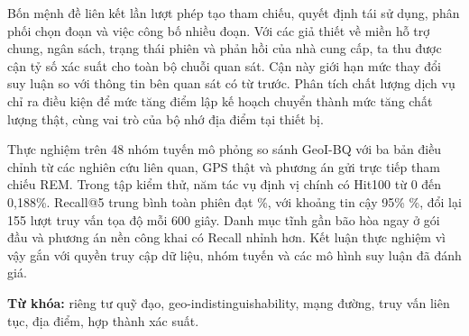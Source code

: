 Bốn mệnh đề liên kết lần lượt phép tạo tham chiếu, quyết định tái sử dụng, phân phối chọn
đoạn và việc công bố nhiều đoạn. Với các giả thiết về miền hỗ trợ chung, ngân sách, trạng
thái phiên và phản hồi của nhà cung cấp, ta thu được cận tỷ số xác suất cho toàn bộ chuỗi
quan sát. Cận này giới hạn mức thay đổi suy luận so với thông tin bên quan sát có từ trước.
Phân tích chất lượng dịch vụ chỉ ra điều kiện để mức tăng điểm lập kế hoạch chuyển thành
mức tăng chất lượng thật, cùng vai trò của bộ nhớ địa điểm tại thiết bị.

Thực nghiệm trên 48 nhóm tuyến mô phỏng so sánh GeoI-BQ với ba bản điều chỉnh từ các
nghiên cứu liên quan, GPS thật và phương án gửi trực tiếp tham chiếu REM. Trong tập kiểm
thử, năm tác vụ định vị chính có Hit100 từ 0 đến 0,188\%. Recall@5 trung bình toàn phiên
đạt \PrimaryRecall\%, với khoảng tin cậy 95\% \PrimaryCI\%, đổi lại 155 lượt truy vấn tọa
độ mỗi 600 giây. Danh mục tĩnh gần bão hòa ngay ở gói đầu và phương án nền công khai có
Recall nhỉnh hơn. Kết luận thực nghiệm vì vậy gắn với quyền truy cập dữ liệu, nhóm tuyến
và các mô hình suy luận đã đánh giá.

\noindent\textbf{Từ khóa:} riêng tư quỹ đạo, geo-indistinguishability, mạng đường,
truy vấn liên tục, địa điểm, hợp thành xác suất.

\clearpage
\begingroup\small{}\setlength{\parskip}{0pt}\tableofcontents\endgroup
\clearpage
\begingroup\small{}\setlength{\parskip}{0pt}\listoffigures\endgroup
\clearpage
\begingroup\small{}\setlength{\parskip}{0pt}\listoftables\endgroup

